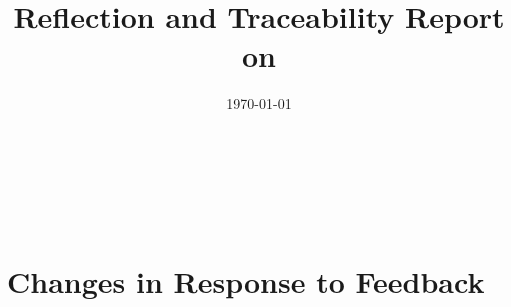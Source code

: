 \documentclass{article}
\title{Reflection and Traceability Report on \progname}
\author{\authname}
\date{\today}
\begin{document}
\maketitle


~\newpage
{}

\tableofcontents


~\newpage

\section{Changes in Response to Feedback}




\end{document}
